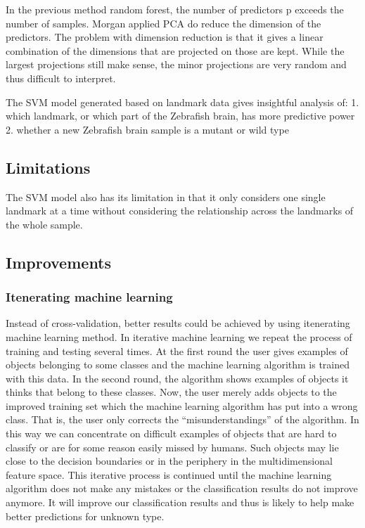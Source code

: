 \documentclass[10pt,letterpaper]{article}
\begin{document}
In the previous method random forest, the number of predictors p exceeds
the number of samples. Morgan applied PCA do reduce the dimension of the
predictors. The problem with dimension reduction is that it gives a
linear combination of the dimensions that are projected on those are
kept. While the largest projections still make sense, the minor
projections are very random and thus difficult to interpret.

The SVM model generated based on landmark data gives insightful analysis
of: 1. which landmark, or which part of the Zebrafish brain, has more
predictive power 2. whether a new Zebrafish brain sample is a mutant or
wild type

\subsection{Limitations}\label{limitations}

The SVM model also has its limitation in that it only considers one
single landmark at a time without considering the relationship across
the landmarks of the whole sample.

\subsection{Improvements}\label{improvements}

\subsubsection{Itenerating machine
learning}\label{itenerating-machine-learning}

Instead of cross-validation, better results could be achieved by using
itenerating machine learning method. In iterative machine learning we
repeat the process of training and testing several times. At the first
round the user gives examples of objects belonging to some classes and
the machine learning algorithm is trained with this data. In the second
round, the algorithm shows examples of objects it thinks that belong to
these classes. Now, the user merely adds objects to the improved
training set which the machine learning algorithm has put into a wrong
class. That is, the user only corrects the ``misunderstandings'' of the
algorithm. In this way we can concentrate on difficult examples of
objects that are hard to classify or are for some reason easily missed
by humans. Such objects may lie close to the decision boundaries or in
the periphery in the multidimensional feature space. This iterative
process is continued until the machine learning algorithm does not make
any mistakes or the classification results do not improve anymore. It
will improve our classification results and thus is likely to help make
better predictions for unknown type.
\end{document}
